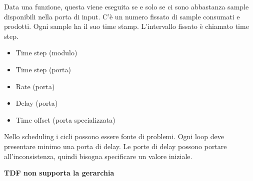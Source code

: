 \documentclass[a4paper]{article}
\begin{document}
			Data una funzione, questa viene eseguita se e solo se ci sono abbastanza sample disponibili nella porta di input. C'è un numero fissato di sample consumati e prodotti. Ogni sample ha il suo time stamp. L'intervallo fissato è chiamato time step.
			
			\begin{itemize}
				\item Time step (modulo)
				\item Time step (porta)
				\item Rate (porta)
				\item Delay (porta)
				\item Time offset (porta specializzata)
			\end{itemize}
			
			Nello scheduling i cicli possono essere fonte di problemi. Ogni loop deve presentare minimo una porta di delay. Le porte di delay possono portare all'inconsistenza, quindi bisogna specificare un valore iniziale.
			
			\textbf{TDF non supporta la gerarchia}
\end{document}
